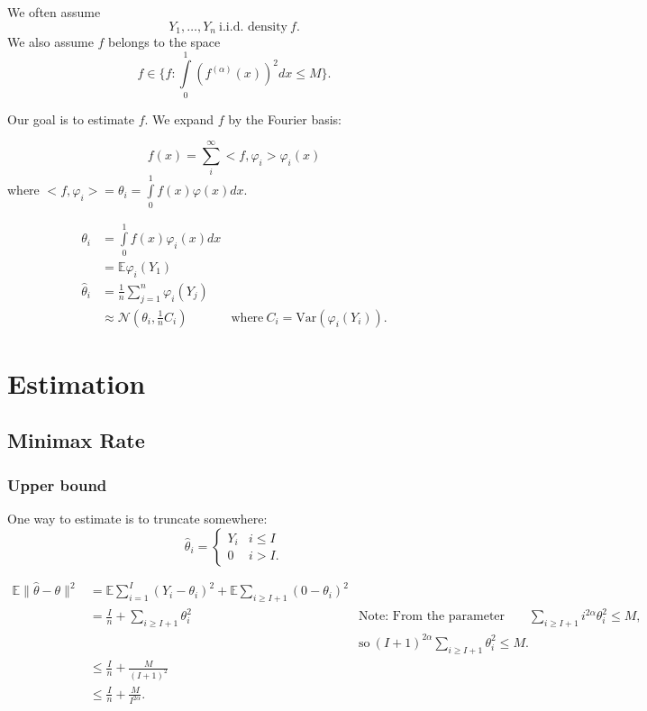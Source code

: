 \documentclass[twoside]{article}
\theoremstyle{definition}
\theoremstyle{definition}
\theoremstyle{remark}
\begin{document}
We often assume
\[Y_1, \ldots, Y_n \ \text{i.i.d. density} \ f.\]
We also assume $f$ belongs to the space
\[
f \in \{ f: \int \limits_0^1 (f^{(\alpha)}(x))^2 dx \leq M \}.
\]

Our goal is to estimate $f$. We expand $f$ by the Fourier basis:

\[
f(x) = \sum \limits_i^\infty <f, \varphi_i> \varphi_i(x)
\]
where $<f, \varphi_i> = \theta_i = \int \limits_0^1 f(x) \varphi (x)dx$.

\[
\begin{aligned}
\theta_i &= \int \limits_0^1 f(x) \varphi_i (x) dx \\
&= \mathbb{E} \varphi_i (Y_1) \\
\hat\theta_i &= \frac{1}{n} \sum \limits_{j=1}^n \varphi_i (Y_j) \\
&\approx \mathcal{N} (\theta_i, \frac{1}{n} C_i) & \text{where} \ C_i = \text{Var}(\varphi_i (Y_i)).
\end{aligned}
\]

\section{Estimation}

\subsection{Minimax Rate}

\subsubsection{Upper bound}

One way to estimate is to truncate somewhere:
\[
\hat\theta_i = \begin{cases}
Y_i &  i \leq I \\
0 & i > I.
\end{cases}
\]

\[
\begin{aligned}
\mathbb{E} \| \hat\theta - \theta \|^2 &= \mathbb{E} \sum \limits_{i=1}^I (Y_i - \theta_i)^2 + \mathbb{E} \sum_{i \geq I+1} (0 - \theta_i)^2 \\
&= \frac{I}{n} + \sum_{i \geq I+1} \theta_i^2 & \text{Note: From the parameter space, we have} \sum_{i \geq I+1} i^{2\alpha} \theta_i^2 \leq M, \\
& & \text{so} \ (I+1)^{2\alpha} \sum_{i \geq I+1} \theta_i^2 \leq M. \\
&\leq \frac{I}{n} + \frac{M}{(I+1)^2} \\
&\leq \frac{I}{n} + \frac{M}{I^{2\alpha}}.
\end{aligned}
\]
\end{document}
